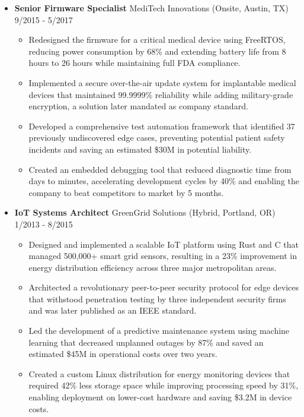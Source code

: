 \documentclass[11pt]{article}
\begin{document}
\begin{itemize}[noitemsep, topsep=0pt, itemsep=1.5em, label=, leftmargin=0em]
\item \textbf{Senior Firmware Specialist} \textperiodcentered MediTech Innovations (Onsite, Austin, TX) \hfill 9/2015 - 5/2017
\begin{itemize}[label=›, noitemsep, topsep=0pt, leftmargin=1em]
	\item Redesigned the firmware for a critical medical device using FreeRTOS, reducing power consumption by 68\% and extending battery life from 8 hours to 26 hours while maintaining full FDA compliance.
	\item Implemented a secure over-the-air update system for implantable medical devices that maintained 99.9999\% reliability while adding military-grade encryption, a solution later mandated as company standard.
	\item Developed a comprehensive test automation framework that identified 37 previously undiscovered edge cases, preventing potential patient safety incidents and saving an estimated \$30M in potential liability.
	\item Created an embedded debugging tool that reduced diagnostic time from days to minutes, accelerating development cycles by 40\% and enabling the company to beat competitors to market by 5 months.
\end{itemize}

\item \textbf{IoT Systems Architect} \textperiodcentered GreenGrid Solutions (Hybrid, Portland, OR) \hfill 1/2013 - 8/2015
\begin{itemize}[label=›, noitemsep, topsep=0pt, leftmargin=1em]
	\item Designed and implemented a scalable IoT platform using Rust and C that managed 500,000+ smart grid sensors, resulting in a 23\% improvement in energy distribution efficiency across three major metropolitan areas.
	\item Architected a revolutionary peer-to-peer security protocol for edge devices that withstood penetration testing by three independent security firms and was later published as an IEEE standard.
	\item Led the development of a predictive maintenance system using machine learning that decreased unplanned outages by 87\% and saved an estimated \$45M in operational costs over two years.
	\item Created a custom Linux distribution for energy monitoring devices that required 42\% less storage space while improving processing speed by 31\%, enabling deployment on lower-cost hardware and saving \$3.2M in device costs.
\end{itemize}
\end{itemize}
\end{document}
